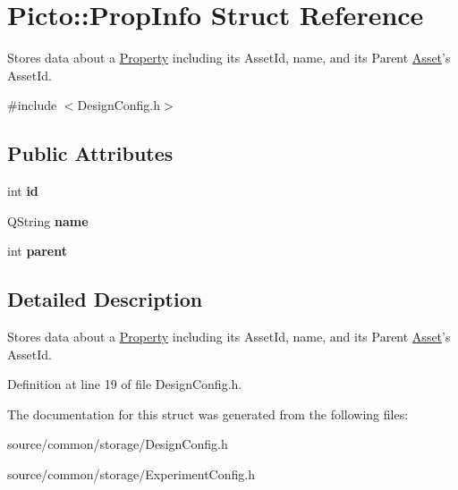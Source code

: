 \hypertarget{struct_picto_1_1_prop_info}{\section{Picto\-:\-:Prop\-Info Struct Reference}
\label{struct_picto_1_1_prop_info}
}


Stores data about a \hyperlink{class_picto_1_1_property}{Property} including its Asset\-Id, name, and its Parent \hyperlink{class_picto_1_1_asset}{Asset}'s Asset\-Id.  




{\ttfamily \#include $<$Design\-Config.\-h$>$}

\subsection*{Public Attributes}
\begin{DoxyCompactItemize}
\item 
\hypertarget{struct_picto_1_1_prop_info_ac037cc5750a5524a35e00d4b9df12753}{int {\bfseries id}}\label{struct_picto_1_1_prop_info_ac037cc5750a5524a35e00d4b9df12753}

\item 
\hypertarget{struct_picto_1_1_prop_info_a11cd0dd25696f14a15e4bd8d83aedf05}{Q\-String {\bfseries name}}\label{struct_picto_1_1_prop_info_a11cd0dd25696f14a15e4bd8d83aedf05}

\item 
\hypertarget{struct_picto_1_1_prop_info_ae3d7d7a33ac9bb8e3ec2b503571d312b}{int {\bfseries parent}}\label{struct_picto_1_1_prop_info_ae3d7d7a33ac9bb8e3ec2b503571d312b}

\end{DoxyCompactItemize}


\subsection{Detailed Description}
Stores data about a \hyperlink{class_picto_1_1_property}{Property} including its Asset\-Id, name, and its Parent \hyperlink{class_picto_1_1_asset}{Asset}'s Asset\-Id. 

Definition at line 19 of file Design\-Config.\-h.



The documentation for this struct was generated from the following files\-:\begin{DoxyCompactItemize}
\item 
source/common/storage/Design\-Config.\-h\item 
source/common/storage/Experiment\-Config.\-h\end{DoxyCompactItemize}
